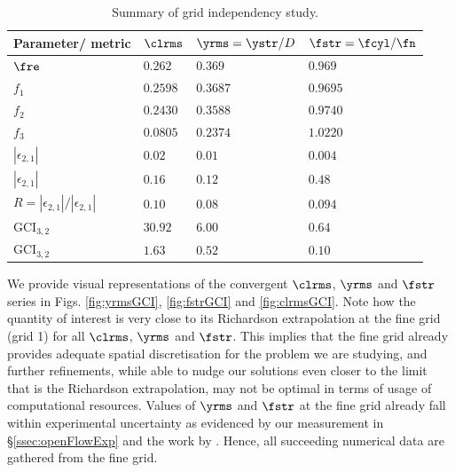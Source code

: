 \documentclass[a4paper,fleqn]{cas-sc}
\begin{document}
\begin{table}[width=0.9\linewidth,cols=4,pos=h]
  \caption{Summary of grid independency study.} \label{tab:gridIndependency}
\begin{tabular*}{\tblwidth}{@{} LLLL@{} }
\toprule
Parameter/ metric                                                       & $\clrms$       & $\yrms = \ystr/D$ & $\fstr = \fcyl / \fn$ \\
\midrule
$\fre$                                                                  & $0.262$        & $0.369$           & $0.969$               \\
$f_{1}$                                                                 & $0.2598$       & $0.3687$          & $0.9695$              \\
$f_{2}$                                                                 & $0.2430$       & $0.3588$          & $0.9740$              \\
$f_{3}$                                                                 & $0.0805$       & $0.2374$          & $1.0220$              \\
$\left | \epsilon_{2,1} \right |$                                       & $0.02$         & $0.01$            & $0.004$               \\
$\left | \epsilon_{2,1} \right |$                                       & $0.16$         & $0.12$            & $0.48$                \\
$R = \left | \epsilon_{2,1} \right | / \left | \epsilon_{2,1} \right |$ & $0.10$         & $0.08$            & $0.094$               \\
$\text{GCI}_{3,2}$                                                      & $30.92$        & $6.00$            & $0.64$                \\  
$\text{GCI}_{3,2}$                                                      & $1.63$         & $0.52$            & $0.10$                \\
\bottomrule
\end{tabular*}
\end{table}

We provide visual representations of the convergent $\clrms$, $\yrms$ and $\fstr$ series in Figs. \ref{fig:yrmsGCI}, \ref{fig:fstrGCI} and \ref{fig:clrmsGCI}. Note how the quantity of interest is very close to its Richardson extrapolation at the fine grid (grid 1) for all $\clrms$, $\yrms$ and $\fstr$. This implies that the fine grid already provides adequate spatial discretisation for the problem we are studying, and further refinements, while able to nudge our solutions even closer to the limit that is the Richardson extrapolation, may not be optimal in terms of usage of computational resources. Values of $\yrms$ and $\fstr$ at the fine grid already fall within experimental uncertainty as evidenced by our measurement in \S \ref{ssec:openFlowExp} and the work by \citet{Koide2013}. Hence, all succeeding numerical data are gathered from the fine grid.
\end{document}
